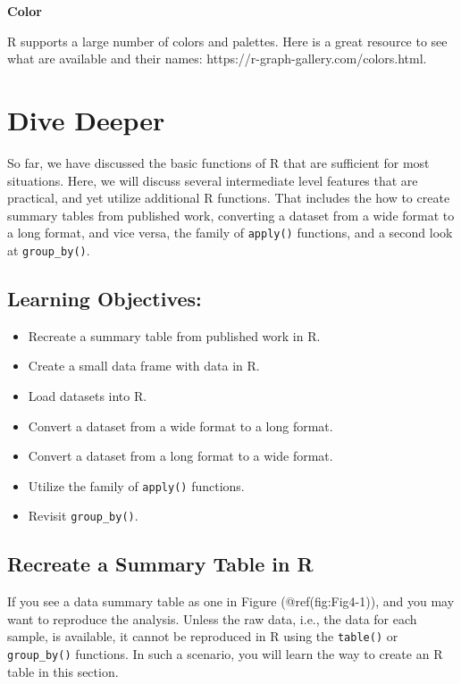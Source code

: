 \documentclass[
  letterpaper,
]{book}
\begin{document}
\textbf{Color}

R supports a large number of colors and palettes. Here is a great
resource to see what are available and their names:
https://r-graph-gallery.com/colors.html.


\chapter{Dive Deeper}\label{dive-deeper}

So far, we have discussed the basic functions of R that are sufficient
for most situations. Here, we will discuss several intermediate level
features that are practical, and yet utilize additional R functions.
That includes the how to create summary tables from published work,
converting a dataset from a wide format to a long format, and vice
versa, the family of \texttt{apply()} functions, and a second look at
\texttt{group\_by()}.

\section*{Learning Objectives:}\label{learning-objectives-3}


\begin{itemize}
\item
  Recreate a summary table from published work in R.
\item
  Create a small data frame with data in R.
\item
  Load datasets into R.
\item
  Convert a dataset from a wide format to a long format.
\item
  Convert a dataset from a long format to a wide format.
\item
  Utilize the family of \texttt{apply()} functions.
\item
  Revisit \texttt{group\_by()}.
\end{itemize}

\section{Recreate a Summary Table in
R}\label{recreate-a-summary-table-in-r}

If you see a data summary table as one in Figure (@ref(fig:Fig4-1)), and
you may want to reproduce the analysis. Unless the raw data, i.e., the
data for each sample, is available, it cannot be reproduced in R using
the \texttt{table()} or \texttt{group\_by()} functions. In such a
scenario, you will learn the way to create an R table in this section.
\end{document}
